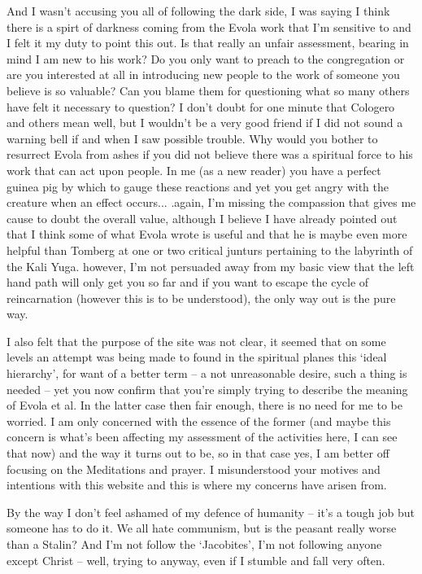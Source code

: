 \begin{footnotesize}
\begin{sffamily}
And I wasn't accusing you all of following the dark side, I was saying I think there is a spirt of darkness coming from the Evola work that I'm sensitive to and I felt it my duty to point this out. Is that really an unfair assessment, bearing in mind I am new to his work? Do you only want to preach to the congregation or are you interested at all in introducing new people to the work of someone you believe is so valuable? Can you blame them for questioning what so many others have felt it necessary to question? I don't doubt for one minute that Cologero and others mean well, but I wouldn't be a very good friend if I did not sound a warning bell if and when I saw possible trouble. Why would you bother to resurrect Evola from ashes if you did not believe there was a spiritual force to his work that can act upon people. In me (as a new reader) you have a perfect guinea pig by which to gauge these reactions and yet you get angry with the creature when an effect occurs... .again, I'm missing the compassion that gives me cause to doubt the overall value, although I believe I have already pointed out that I think some of what Evola wrote is useful and that he is maybe even more helpful than Tomberg at one or two critical junturs pertaining to the labyrinth of the Kali Yuga. however, I'm not persuaded away from my basic view that the left hand path will only get you so far and if you want to escape the cycle of reincarnation (however this is to be understood), the only way out is the pure way.

I also felt that the purpose of the site was not clear, it seemed that on some levels an attempt was being made to found in the spiritual planes this `ideal hierarchy', for want of a better term -- a not unreasonable desire, such a thing is needed -- yet you now confirm that you're simply trying to describe the meaning of Evola et al. In the latter case then fair enough, there is no need for me to be worried. I am only concerned with the essence of the former (and maybe this concern is what's been affecting my assessment of the activities here, I can see that now) and the way it turns out to be, so in that case yes, I am better off focusing on the Meditations and prayer. I misunderstood your motives and intentions with this website and this is where my concerns have arisen from.

By the way I don't feel ashamed of my defence of humanity -- it's a tough job but someone has to do it. We all hate communism, but is the peasant really worse than a Stalin? And I'm not follow the `Jacobites', I'm not following anyone except Christ -- well, trying to anyway, even if I stumble and fall very often.


\end{sffamily}
\end{footnotesize}
